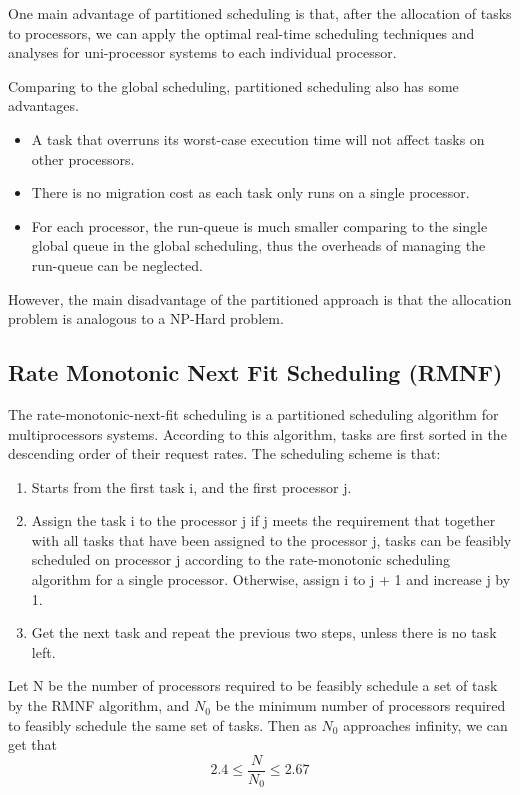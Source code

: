 \documentclass[preprint,12pt]{elsarticle}
\begin{document}
One main advantage of partitioned scheduling is that, after the allocation of tasks to processors, we can apply the optimal real-time scheduling techniques and analyses for uni-processor systems to each individual processor. 

Comparing to the global scheduling, partitioned scheduling also has some advantages. 
\begin{itemize}
\item A task that overruns its worst-case execution time will not affect tasks on other processors.
\item There is no migration cost as each task only runs on a single processor.
\item For each processor, the run-queue is much smaller comparing to the single global queue in the global scheduling, thus the overheads of managing the run-queue can be neglected. 
\end{itemize}

However, the main disadvantage of the partitioned approach is that the allocation problem is analogous to a NP-Hard problem. 

\subsection{Rate Monotonic Next Fit Scheduling (RMNF)}
The rate-monotonic-next-fit scheduling \cite{dhall1978real} is a partitioned scheduling algorithm for multiprocessors systems. According to this algorithm, tasks are first sorted in the descending order of their request rates. The scheduling scheme is that:
\begin{enumerate}
\item Starts from the first task i, and the first processor j. 
\item Assign the task i to the processor j if j meets the requirement that together with all tasks that have been assigned to the processor j, tasks can be feasibly scheduled on processor j according to the rate-monotonic scheduling algorithm for a single processor. Otherwise, assign i to j + 1 and increase j by 1. 
\item Get the next task and repeat the previous two steps, unless there is no task left.
\end{enumerate}

Let N be the number of processors required to be feasibly schedule a set of task by the RMNF algorithm, and $N_0$ be the minimum number of processors required to feasibly schedule the same set of tasks. Then as $N_0$ approaches infinity, we can get that \cite{dhall1978real}
\begin{equation}
    2.4 \leq \frac{N}{N_0} \leq 2.67 
\end{equation}
\end{document}
